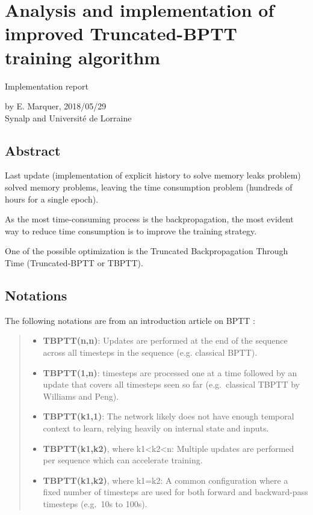 \section*{Analysis and implementation of improved Truncated-BPTT training
algorithm}

Implementation report

by E. Marquer, 2018/05/29\\
Synalp and Université de Lorraine

\subsection{Abstract}

Last update (implementation of explicit history to solve memory leaks
problem) solved memory problems, leaving the time consumption problem
(hundreds of hours for a single epoch).

As the most time-consuming process is the backpropagation, the most
evident way to reduce time consumption is to improve the training
strategy.

One of the possible optimization is the Truncated Backpropagation
Through Time (Truncated-BPTT or TBPTT).

\subsection{Notations}

The following notations are from {an introduction article on BPTT} \autocite{bptt-intro}:

\begin{quote}
\begin{itemize}
\item
  \textbf{TBPTT(n,n)}: Updates are performed at the end of the sequence
  across all timesteps in the sequence (e.g. classical BPTT).
\item
  \textbf{TBPTT(1,n)}: timesteps are processed one at a time followed by
  an update that covers all timesteps seen so far (e.g.~classical TBPTT
  by Williams and Peng).
\item
  \textbf{TBPTT(k1,1)}: The network likely does not have enough temporal
  context to learn, relying heavily on internal state and inputs.
\item
  \textbf{TBPTT(k1,k2)}, where k1\textless{}k2\textless{}n: Multiple
  updates are performed per sequence which can accelerate training.
\item
  \textbf{TBPTT(k1,k2)}, where k1=k2: A common configuration where a
  fixed number of timesteps are used for both forward and backward-pass
  timesteps (e.g.~10s to 100s).
\end{itemize}
\end{quote}


